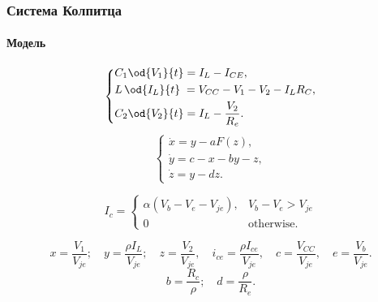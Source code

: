 \documentclass[10pt,utf8]{beamer}
\newlength\TW
\begin{document}

\begin{frame}
  \frametitle{Система Колпитца}
  \framesubtitle{Модель}

    \begin{equation}
    \label{atu:eq:colp_phys}
    \begin{dcases}
      C_1 \od{V_{1}}{t}  = I_L - I_{CE} , \\
      L\, \od{I_L}{t} \; = V_{CC} - V_{1} - V_{2} - I_L R_C , \\
      C_2 \od{V_{2}}{t}  = I_L - \frac{V_{2}}{R_e}.
    \end{dcases}
    \end{equation}
    \begin{equation}
    \label{atu:eq:colp}
    \begin{cases}
      \dot{x} = y - a F(z), \\
      \dot{y} = c - x - by - z, \\
      \dot{z} = y - d z.
    \end{cases}
    \end{equation}

    \begin{equation}
    I_c =
      \begin{cases}
        \alpha ( V_b - V_e - V_{je} ), & V_b - V_e > V_{je} \\
        0                              & \text{otherwise}.
      \end{cases}
      \label{atu:eq:bjt_libear_model}
    \end{equation}

\[
  x = \frac{V_{1}}{V_{je}} ; \quad
  y = \frac{\rho I_L}{V_{je}} ; \quad
  z = \frac{V_{2}}{V_{je}}, \quad
  i_{ce} = \frac{\rho I_{ce}}{V_{je}}, \quad
  c = \frac{V_{CC}}{V_{je}}, \quad
  e = \frac{V_{b}}{V_{je}}.
\]
%
\[
  b = \frac{R_c}{\rho}; \quad
  d = \frac{\rho}{R_e}. %
\]

\end{frame}



\end{document}
